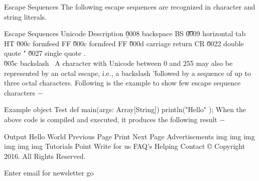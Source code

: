 Escape Sequences
The following escape sequences are recognized in character and string literals.

Escape Sequences	Unicode	Description
\b	\u0008	backspace BS
\t	\u0009	horizontal tab HT
\n	\u000c	formfeed FF
\f	\u000c	formfeed FF
\r	\u000d	carriage return CR
\"	\u0022	double quote "
\'	\u0027	single quote .
\\	\u005c	backslash \
A character with Unicode between 0 and 255 may also be represented by an octal escape, i.e., a backslash '\' followed by a sequence of up to three octal characters. Following is the example to show few escape sequence characters −

Example
object Test {
   def main(args: Array[String]) {
      println("Hello\tWorld\n\n" );
   }
} 
When the above code is compiled and executed, it produces the following result −

Output
Hello   World
 Previous Page  Print Next Page  
Advertisements
 img  img  img  img  img  img
 Tutorials Point
Write for us FAQ's Helping Contact
© Copyright 2016. All Rights Reserved.

Enter email for newsletter
  go
